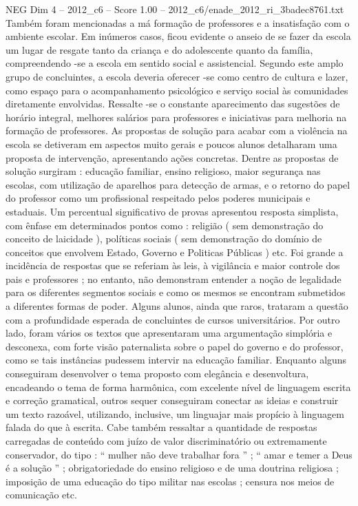 \begin{textsample}{NEG Dim 4 – 2012\_c6 – Score 1.00 – 2012\_c6/enade\_2012\_ri\_3badec8761.txt}
Também foram mencionadas a má formação de professores e a insatisfação com o ambiente escolar.
Em inúmeros casos, ficou evidente o anseio de se fazer da escola um lugar de resgate tanto da criança e do adolescente quanto da família, compreendendo -se a escola em sentido social e assistencial.
Segundo este amplo grupo de concluintes, a escola deveria oferecer -se como centro de cultura e lazer, como espaço para o acompanhamento psicológico e serviço social às comunidades diretamente envolvidas.
Ressalte -se o constante aparecimento das sugestões de horário integral, melhores salários para professores e iniciativas para melhoria na formação de professores.
As propostas de solução para acabar com a violência na escola se detiveram em aspectos muito gerais e poucos alunos detalharam uma proposta de intervenção, apresentando ações concretas.
Dentre as propostas de solução surgiram : educação familiar, ensino religioso, maior segurança nas escolas, com utilização de aparelhos para detecção de armas, e o retorno do papel do professor como um profissional respeitado pelos poderes municipais e estaduais.
Um percentual significativo de provas apresentou resposta simplista, com ênfase em determinados pontos como : religião ( sem demonstração do conceito de laicidade ), políticas sociais ( sem demonstração do domínio de conceitos que envolvem Estado, Governo e Politicas Públicas ) etc.
Foi grande a incidência de respostas que se referiam às leis, à vigilância e maior controle dos pais e professores ; no entanto, não demonstram entender a noção de legalidade para os diferentes segmentos sociais e como os mesmos se encontram submetidos a diferentes formas de poder.
Alguns alunos, ainda que raros, trataram a questão com a profundidade esperada de concluintes de cursos universitários.
Por outro lado, foram vários os textos que apresentaram uma argumentação simplória e desconexa, com forte visão paternalista sobre o papel do governo e do professor, como se tais instâncias pudessem intervir na educação familiar.
Enquanto alguns conseguiram desenvolver o tema proposto com elegância e desenvoltura, encadeando o tema de forma harmônica, com excelente nível de linguagem escrita e correção gramatical, outros sequer conseguiram conectar as ideias e construir um texto razoável, utilizando, inclusive, um linguajar mais propício à linguagem falada do que à escrita.
Cabe também ressaltar a quantidade de respostas carregadas de conteúdo com juízo de valor discriminatório ou extremamente conservador, do tipo : “ mulher não deve trabalhar fora ” ; “ amar e temer a Deus é a solução ” ; obrigatoriedade do ensino religioso e de uma doutrina religiosa ; imposição de uma educação do tipo militar nas escolas ; censura nos meios de comunicação etc.

\end{textsample}
